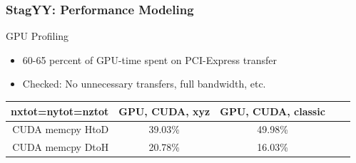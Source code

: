 \begin{frame}[fragile]\frametitle{StagYY: Performance Modeling}

  \begin{block}{GPU Profiling}
   \begin{itemize}
    \item 60-65 percent of GPU-time spent on PCI-Express transfer
    \item Checked: No unnecessary transfers, full bandwidth, etc.
   \end{itemize}
  \end{block}

  \begin{center}
\begin{tabular}{|r|c|c|c|c|}
 \hline
 \textbf{nxtot=nytot=nztot}   & \textbf{GPU, CUDA, xyz} & \textbf{GPU, CUDA, classic}  \\
 \hline
 \hline
 CUDA memcpy HtoD           &  39.03\% &  49.98\%  \\
 CUDA memcpy DtoH           &  20.78\% &  16.03\%  \\
 \hline
\end{tabular}
\end{center}


\end{frame}


